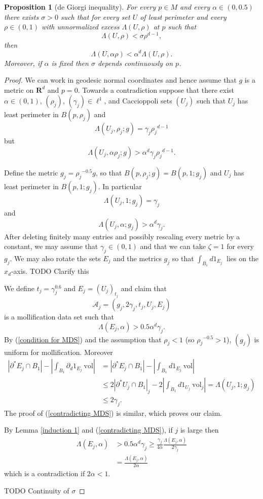 \documentclass[reqno,12pt,letterpaper]{amsart}
\newcommand{\RR}{\mathbf{R}}
\newcommand{\vol}{\mathrm{vol}}
\newtheorem{proposition}[theorem]{Proposition}
\theoremstyle{definition}
\numberwithin{equation}{section}
\begin{document}
\begin{proposition}[de Giorgi inequality]\label{induction 2}
For every $p \in M$ and every $\alpha \in (0, 0.5)$ there exists $\sigma > 0$ such that for every set $U$ of least perimeter and every $\rho \in (0, 1)$ with unnormalized excess $\Lambda(U, \rho)$ at $p$ such that
$$\Lambda(U, \rho) < \sigma \rho^{d - 1},$$
then
$$\Lambda(U, \alpha\rho) < \alpha^d \Lambda(U, \rho).$$
Moreover, if $\alpha$ is fixed then $\sigma$ depends continuously on $p$.
\end{proposition}
\begin{proof}
We can work in geodesic normal coordinates and hence assume that $g$ is a metric on $\RR^d$ and $p = 0$.
Towards a contradiction suppose that there exist $\alpha \in (0, 1)$, $(\rho_j)$, $(\gamma_j) \in \ell^1$, and Caccioppoli sets $(U_j)$ such that $U_j$ has least perimeter in $B(p, \rho_j)$ and
$$\Lambda(U_j, \rho_j; g) = \gamma_j {\rho_j}^{d - 1}$$
but
$$\Lambda(U_j, \alpha \rho_j; g) > \alpha^d \gamma_j {\rho_j}^{d - 1}.$$

Define the metric $g_j = {\rho_j}^{-0.5} g$, so that $B(p, \rho_j; g) = B(p, 1; g_j)$ and $U_j$ has least perimeter in $B(p, 1; g_j)$.
In particular
$$\Lambda(U_j, 1; g_j) = \gamma_j$$
and
$$\Lambda(U_j, \alpha; g_j) > \alpha^d \gamma_j.$$
After deleting finitely many entries and possibly rescaling every metric by a constant, we may assume that $\gamma_j \in (0, 1)$ and that we can take $\zeta = 1$ for every $g_j$.
We may also rotate the sets $E_j$ and the metrics $g_j$ so that $\int_{B_1} d1_{E_j} ~$ lies on the $x_d$-axis.
TODO Clarify this

We define $t_j = \gamma_j^{0.6}$ and $E_j = (U_j)_{t_j}$ and claim that
$$\mathcal A_j = (g_j, 2\gamma_j, t_j, U_j, E_j)$$
is a mollification data set such that
\begin{equation}
\label{contradicting MDS}
\Lambda(E_j, \alpha) > 0.5\alpha^d\gamma_j.
\end{equation}
By (\ref{condition for MDS}) and the assumption that $\rho_j < 1$ (so ${\rho_j}^{-0.5} > 1$), $(g_j)$ is uniform for mollification.
Moreover
\begin{align*}
|\partial^* E_j \cap B_1| - \left|\int_{B_1} \partial_d 1_{E_j} ~\vol\right| &= |\partial^* E_j \cap B_1| - \left|\int_{B_1} d1_{E_j} ~\vol\right| \\
&\leq 2|\partial^* U_j \cap B_1|_j - 2\left|\int_{B_1} d1_{U_j} ~\vol_j\right| = \Lambda(U_j, 1; g_j) \\
&\leq 2\gamma_j.
\end{align*}
The proof of (\ref{contradicting MDS}) is similar, which proves our claim.

By Lemma \ref{induction 1} and (\ref{contradicting MDS}), if $j$ is large then
\begin{align*}
\Lambda(E_j, \alpha) &> 0.5 \alpha^d \gamma_j \geq \frac{\gamma_j}{4\alpha} \frac{\Lambda(E_j, \alpha)}{2\gamma_j} \\
&= \frac{\Lambda(E_j, \alpha)}{2\alpha}
\end{align*}
which is a contradiction if $2\alpha < 1$.

TODO Continuity of $\sigma$
\end{proof}
\end{document}
